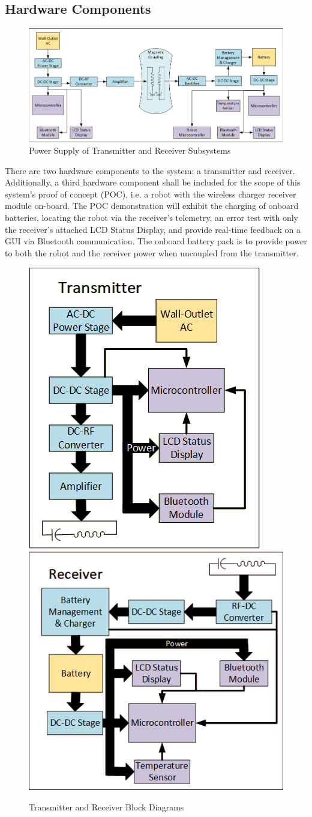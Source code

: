 \documentclass[12pt]{article}
\begin{document}
\subsection{Hardware Components}
\begin{figure}[h!]
\includegraphics[width=0.92\linewidth]{power_supply_diagram}
\caption{Power Supply of Transmitter and Receiver Subsystems}
\end{figure}
\indent
There are two hardware components to the system: a transmitter and receiver.  Additionally, a third hardware component shall be included for the scope of this system's proof of concept (POC), i.e. a robot with the wireless charger receiver module on-board.  The POC demonstration will exhibit the charging of onboard batteries, locating the robot via the receiver's telemetry, an error test with only the receiver's attached LCD Status Display, and provide real-time feedback on a GUI via Bluetooth communication.  The onboard battery pack is to provide power to both the robot and the receiver power when uncoupled from the transmitter. 
\begin{figure}[h!]
\centering
\includegraphics[width=0.41\linewidth]{transmitter_diagram.png}
\includegraphics[width=0.532\linewidth]{receiver_diagram.png}
\caption{Transmitter and Receiver Block Diagrams}
\end{figure}
\hfill \\
\end{document}
